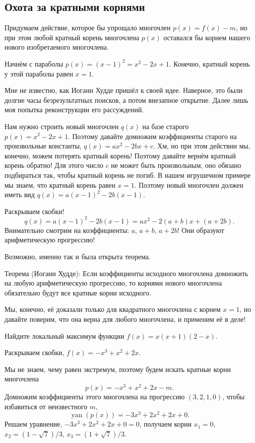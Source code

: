 \documentclass[12pt]{article}
\DeclareMathOperator{\yan}{yan}
\begin{document}
\subsection*{Охота за кратными корнями}

Придумаем действие, которое бы упрощало многочлен $p(x) = f(x) - m$, 
но при этом любой кратный корень многочлена $p(x)$ оставался бы корнем нашего нового изобретаемого многочлена.

Начнём с параболы $p(x) = (x - 1)^2 = x^2 - 2x + 1$. 
Конечно, кратный корень у этой параболы равен $x = 1$.


Мне не известно, как Иоганн Худде пришёл к своей идее. 
Наверное, это были долгие часы безрезультатных поисков, а потом внезапное открытие. 
Далее лишь моя попытка реконструкции его рассуждений. 

Нам нужно строить новый многочлен $q(x)$ на базе старого $p(x) = x^2 - 2x + 1$.
Поэтому давайте домножим коэффициенты старого на произвольные константы, $q(x) = ax^2 - 2bx + c$. 
Хм, но при этом действии мы, конечно, можем потерять кратный корень! 
Поэтому давайте вернём кратный корень обратно! 
Для этого число $c$ не может быть произвольным, оно обязано подбираться так, чтобы кратный корень не погиб. 
В нашем игрушечном примере мы знаем, что кратный корень равен $x = 1$.
Поэтому новый многочлен должен иметь вид $q(x) = a(x - 1)^2 - 2b (x - 1)$.

Раскрываем скобки!
\[
    q(x) = a(x - 1)^2 - 2b (x - 1) = ax^2 - 2(a + b) x + (a + 2b).
\]
Внимательно смотрим на коэффициенты: $a$, $a + b$, $a + 2b$!
Они образуют арифметическую прогрессию!

Возможно, именно так и была открыта теорема.

Теорема (Иоганн Худде):
Если коэффициенты исходного многочлена домножить на любую арифметическую прогрессию,
то корнями нового многочлена обязательно будут все кратные корни исходного. 

Мы, конечно, её доказали только для квадратного многочлена с корнем $x=1$, но давайте поверим, что она верна для любого многочлена, и применим её в деле!

Найдите локальный максимум функции $f(x) = x (x + 1) (2 - x)$.

Раскрываем скобки, $f(x) = -x^3 + x^2 + 2x$.

Мы не знаем, чему равен экстремум, поэтому будем искать кратные корни многочлена 
\[
p(x) = -x^3 + x^2 + 2x - m.
\]
Домножим коэффициенты этого многочлена на прогрессию $(3, 2, 1, 0)$, чтобы избавиться от неизвестного $m$,
\[
\yan(p(x)) = -3x^3 + 2x^2 + 2x + 0.
\]
Решаем уравнение, $-3x^3 + 2x^2 + 2x + 0 = 0$, получаем корни $x_1 = 0$,  $x_2 = (1 - \sqrt{7}) / 3$, $x_3 = (1 + \sqrt{7}) / 3$.
\end{document}
